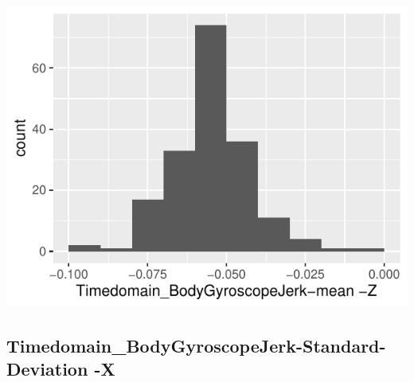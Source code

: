 \documentclass[
]{article}
\begin{document}
\begin{minipage}{0.25 \textwidth}

\includegraphics{codebook_tidydatasub_files/figure-latex/Var-29-Timedomain-BodyGyroscopeJerk-mean--Z-1.pdf}

\end{minipage}

\noindent\makebox[\linewidth]{\rule{\textwidth}{0.4pt}}

\hypertarget{timedomain_bodygyroscopejerk-standard-deviation--x}{%
\subsection{Timedomain\_BodyGyroscopeJerk-Standard-Deviation
-X}\label{timedomain_bodygyroscopejerk-standard-deviation--x}}
\end{document}

